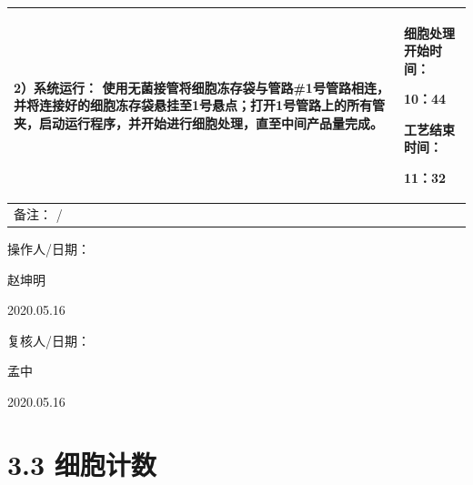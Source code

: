 \documentclass[UTF8,10pt,a4paper,fontset=fandol]{ctexart}
\newcommand{\fieldvalue}[1]{#1}
\newcommand{\handwritten}[1]{#1}
\begin{document}
\vspace{0.4em}

\begin{tabularx}{\textwidth}{|p{}|X|}
\hline
\textbf{2）系统运行：} 使用无菌接管将细胞冻存袋与管路\#1号管路相连，并将连接好的细胞冻存袋悬挂至1号悬点；打开1号管路上的所有管夹，启动运行程序，并开始进行细胞处理，直至中间产品量完成。 &
细胞处理开始时间：

\fieldvalue{\handwritten{10：44}}

\vspace{1em}

工艺结束时间：

\fieldvalue{\handwritten{11：32}}
\\
\hline
\multicolumn{2}{|l|}{备注：\quad
\fieldvalue{\handwritten{/}}} \\
\hline
\end{tabularx}

\vspace{0.3em}

\noindent
操作人/日期：

\fieldvalue{\handwritten{赵坤明}}

\quad

\fieldvalue{\handwritten{2020.05.16}}

\hfill
复核人/日期：

\fieldvalue{\handwritten{孟中}}

\quad

\fieldvalue{\handwritten{2020.05.16}}

\section*{3.3 细胞计数}
\end{document}
